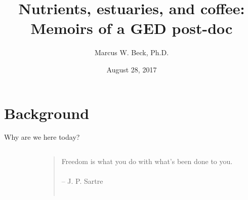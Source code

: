 \documentclass[serif]{beamer}\usepackage[]{graphicx}\usepackage[]{color}
\begin{document}
\title[Memoirs of a GED post-doc]{\textbf{Nutrients, estuaries, and coffee: Memoirs of a GED post-doc}}
\author[M. Beck]{Marcus W. Beck, Ph.D.}


\date{August 28, 2017}


\begin{frame}[shrink]
\titlepage
\end{frame}

\section{Background}

\begin{frame}{Why are we here today?}{}
\begin{columns}
\begin{column}{0.5\textwidth}
\begin{center}
\end{center}
\end{column}
\begin{column}{0.5\textwidth}
\begin{quote}
\Large
Freedom is what you do with what's been done to you.\\~\\
\vspace{0.05in}
\hfill -- J. P. Sartre\\~\\
\end{quote}
\end{column}
\end{columns}
\end{frame}
\end{document}
